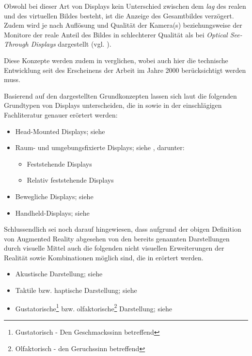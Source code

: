 \documentclass[a4paper,titlepage,12pt]{scrartcl}
\newtheorem[L]{boxedDefinition}{Definition}
\begin{document}
\begin{itemize}
 Obwohl bei dieser Art von Displays kein Unterschied zwischen dem \textit{lag} des realen und des virtuellen Bildes besteht, ist die Anzeige des Gesamtbildes verzögert. Zudem wird je nach Auflösung und Qualität der Kamera(s) beziehungsweise der Monitore der reale Anteil des Bildes in schlechterer Qualität als bei \textit{Optical See-Through Displays} dargestellt (vgl. \cite[Kapitel 2.2, Seite 22]{Toe2010}). 
\end{itemize}
Diese Konzepte werden zudem in \cite{Rolland2000} verglichen, wobei auch hier die technische Entwicklung seit des Erscheinens der Arbeit im Jahre 2000 berücksichtigt werden muss.

Basierend auf den dargestellten Grundkonzepten lassen sich laut \cite[Kapitel 2.2, Seite 22-30]{Toe2010} die folgenden Grundtypen von Displays unterscheiden, die in \cite{Toe2010} sowie in der einschlägigen Fachliteratur genauer erörtert werden:
 \begin{itemize}
 \item Head-Mounted Displays; siehe \cite[Kapitel 2.2.1, Seite 23-25]{Toe2010}
 \item Raum- und umgebungsfixierte Displays; siehe \cite[Kapitel 2.2.2, Seite 25-28]{Toe2010}, darunter:
 \begin{itemize}
    \item Feststehende Displays
    \item Relativ feststehende Displays
 \end{itemize}
 \item Bewegliche Displays; siehe \cite[Kapitel 2.2.3, Seite 28]{Toe2010}
 \item Handheld-Displays; siehe \cite[Kapitel 2.2.4, Seite 28f.]{Toe2010}
\end{itemize}

Schlussendlich sei noch darauf hingewiesen, dass aufgrund der obigen Definition von Augmented Reality abgesehen von den bereits genannten Darstellungen durch visuelle Mittel auch die folgenden nicht visuellen Erweiterungen der Realität sowie Kombinationen möglich sind, die in \cite[Kapitel 2.4, Seite 36-41]{Toe2010} erörtert werden. 
\begin{itemize}
 \item Akustische Darstellung; siehe \cite[Seite 37]{Toe2010}
 \item Taktile bzw. haptische Darstellung; siehe \cite[Seite 38f.]{Toe2010}
 \item Gustatorische\footnote{Gustatorisch - Den Geschmackssinn betreffend} bzw. olfaktorische\footnote{Olfaktorisch - den Geruchssinn betreffend} Darstellung; siehe \cite[Seite 39-41]{Toe2010}
\end{itemize}
\end{document}
